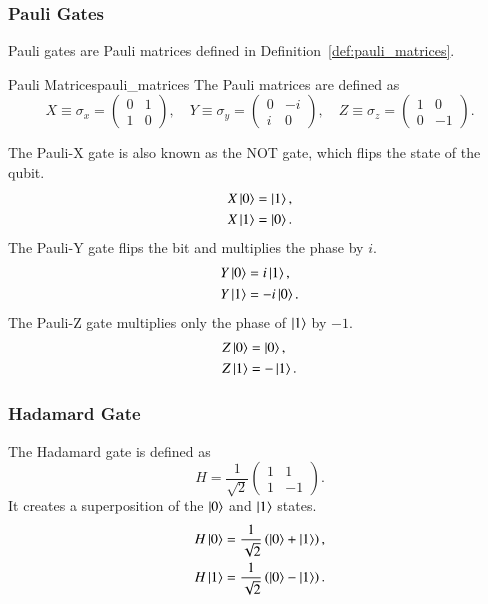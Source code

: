 \subsubsection{Pauli Gates}
Pauli gates are Pauli matrices defined in Definition~\ref{def:pauli_matrices}.
\begin{definition}{Pauli Matrices}{pauli_matrices}
    The Pauli matrices are defined as
\begin{equation}
	X \equiv \sigma_x = \begin{pmatrix}
		0 & 1 \\
		1 & 0
	\end{pmatrix}, \quad
	Y \equiv \sigma_y = \begin{pmatrix}
		0 & -i \\
		i & 0
	\end{pmatrix}, \quad
	Z \equiv \sigma_z = \begin{pmatrix}
		1 & 0 \\
		0 & -1
	\end{pmatrix}.
\end{equation}
\end{definition}

The Pauli-X gate is also known as the NOT gate, which flips the state of the qubit.
\begin{align}
	X\ket{0} &= \ket{1}, \\
	X\ket{1} &= \ket{0}.	
\end{align}
The Pauli-Y gate flips the bit and multiplies the phase by $ i $. 
\begin{align}
	Y\ket{0} &= i\ket{1}, \\
	Y\ket{1} &= -i\ket{0}.
\end{align}
The Pauli-Z gate multiplies only the phase of $\ket{1}$ by $ -1 $.
\begin{align}
	Z\ket{0} &= \ket{0}, \\
	Z\ket{1} &= -\ket{1}.
\end{align}

\subsubsection{Hadamard Gate}
The Hadamard gate is defined as
\begin{equation}
	H = \frac{1}{\sqrt{2}} \begin{pmatrix}
		1 & 1 \\
		1 & -1
	\end{pmatrix}.
\end{equation}
It creates a superposition of the $ \ket{0} $ and $ \ket{1} $ states.
\begin{align}
	H\ket{0} &= \frac{1}{\sqrt{2}} \left( \ket{0} + \ket{1} \right), \\
	H\ket{1} &= \frac{1}{\sqrt{2}} \left( \ket{0} - \ket{1} \right).
\end{align}

